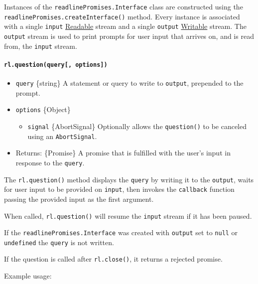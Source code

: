 Instances of the \texttt{readlinePromises.Interface} class are
constructed using the \texttt{readlinePromises.createInterface()}
method. Every instance is associated with a single \texttt{input}
\href{stream.md\#readable-streams}{Readable} stream and a single
\texttt{output} \href{stream.md\#writable-streams}{Writable} stream. The
\texttt{output} stream is used to print prompts for user input that
arrives on, and is read from, the \texttt{input} stream.

\paragraph{\texorpdfstring{\texttt{rl.question(query{[},\ options{]})}}{rl.question(query{[}, options{]})}}\label{rl.questionquery-options}

\begin{itemize}
\tightlist
\item
  \texttt{query} \{string\} A statement or query to write to
  \texttt{output}, prepended to the prompt.
\item
  \texttt{options} \{Object\}

  \begin{itemize}
  \tightlist
  \item
    \texttt{signal} \{AbortSignal\} Optionally allows the
    \texttt{question()} to be canceled using an \texttt{AbortSignal}.
  \end{itemize}
\item
  Returns: \{Promise\} A promise that is fulfilled with the user's input
  in response to the \texttt{query}.
\end{itemize}

The \texttt{rl.question()} method displays the \texttt{query} by writing
it to the \texttt{output}, waits for user input to be provided on
\texttt{input}, then invokes the \texttt{callback} function passing the
provided input as the first argument.

When called, \texttt{rl.question()} will resume the \texttt{input}
stream if it has been paused.

If the \texttt{readlinePromises.Interface} was created with
\texttt{output} set to \texttt{null} or \texttt{undefined} the
\texttt{query} is not written.

If the question is called after \texttt{rl.close()}, it returns a
rejected promise.

Example usage:

\begin{Shaded}
\begin{Highlighting}[]
\OperatorTok{=} \NormalTok{(}\NormalTok{)}\OperatorTok{;}
\NormalTok{(}\SpecialCharTok{$\{}\SpecialCharTok{\}}\VerbatimStringTok{\textasciigrave{}}\NormalTok{)}\OperatorTok{;}
\end{Highlighting}
\end{Shaded}

